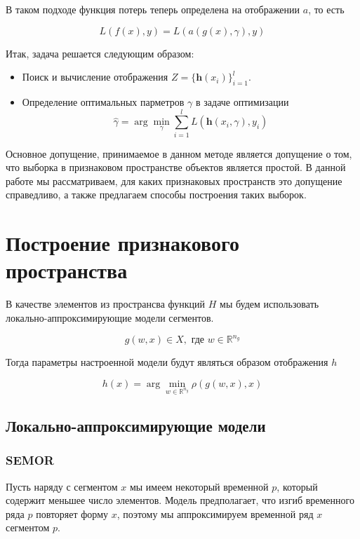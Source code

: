 \documentclass[12pt, fleqn, unicode]{article}
\newcommand{\bh}{\mathbf{h}}
\newcommand{\R}{\mathbb{R}}
\begin{document}
В таком подходе функция потерь теперь определена
на отображении $a$, то есть

$$
L(f(x), y) = L(a(g(x), \gamma), y)
$$

Итак, задача решается следующим образом:

\begin{itemize}
    \item Поиск и вычисление отображения $Z = \{\bh(x_i)\}_{i=1}^l$.
    \item Определение оптимальных парметров $\gamma$ в задаче оптимизации
    $$
    \hat{\gamma} = \arg\min_{\gamma} \sum_{i=1}^{l}L(\bh(x_i, \gamma), y_i)
    $$
\end{itemize}

Основное допущение, принимаемое в данном методе является допущение о том, что
выборка в признаковом пространстве объектов является простой. В данной работе
мы рассматриваем, для каких признаковых пространств это допущение справедливо,
а также предлагаем способы построения таких выборок.

\newpage
\section{Построение признакового пространства}

В качестве элементов из пространсва функций $H$ мы будем использовать
локально-аппроксимирующие модели сегментов.

$$
g(w, x) \in X, \text{ где }w \in \R^{n_g}
$$

Тогда параметры настроенной модели будут являться образом отображения $h$

$$
h(x) = \arg\min_{w \in \R^{n_g}} \rho(g(w, x), x)
$$

\subsection{Локально-аппроксимирующие модели}

\subsubsection{SEMOR}

Пусть наряду с сегментом $x$ мы имеем некоторый временной $p$, который содержит
меньшее число элементов. Модель предполагает, что изгиб временного ряда $p$ повторяет
форму $x$, поэтому мы аппроксимируем временной ряд $x$ сегментом $p$.
\end{document}
